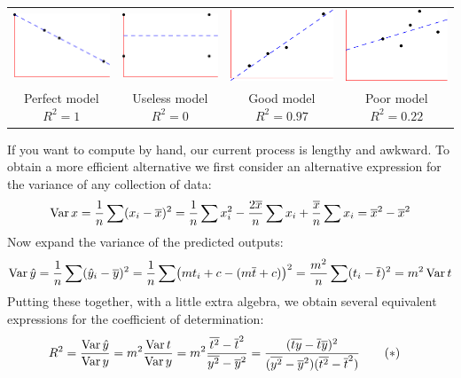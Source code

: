 \begin{center}
\begin{tabular}{@{}c@{\quad\ }c@{\quad\ }c@{\quad\ }c@{}}
\includegraphics{reg-rsq1}
&
\includegraphics{reg-rsq2}
&
\includegraphics{reg-rsq3}
&
\includegraphics{reg-rsq4}
\\
Perfect model $R^2=1$
&
Useless model $R^2=0$
&
Good model $R^2=0.97$
&
Poor model $R^2=0.22$
\end{tabular}
\end{center}


If you want to compute by hand, our current process is lengthy and awkward. To obtain a more efficient alternative we first consider an alternative expression for the variance of any collection of data:
\[
\operatorname{Var} x=\frac 1n\sum(x_i-\overline{x})^2=\frac 1n\sum x_i^2-\frac{2\overline{x}}n\sum x_i+\frac{\overline{x}}n\sum x_i =\overline{x}^2-\overline{x}^2
\]
Now expand the variance of the predicted outputs:
\[
\operatorname{Var}\hat y=\frac 1n\sum(\hat y_i-\overline{y})^2=\frac 1n\sum\bigl(mt_i+c-(m\overline{t}+c)\bigr)^2 =\frac{m^2}n\sum(t_i-\overline{t})^2=m^2\operatorname{Var} t
\]
Putting these together, with a little extra algebra, we obtain several equivalent expressions for the coefficient of determination:\label{pg:rsqalt}
\begin{align*}
R^2&=\frac{\operatorname{Var}\hat y}{\operatorname{Var} y} =m^2\frac{\operatorname{Var} t}{\operatorname{Var} y} = m^2\frac{\overline{t^2}-\overline{t}^2}{\overline{y^2}-\overline{y}^2} = \frac{(\overline{ty}-\overline{t}\overline{y})^2}{(\overline{y^2}-\overline{y}^2)(\overline{t^2}-\overline{t}^2)}
\tag{$\ast$}
\end{align*}

